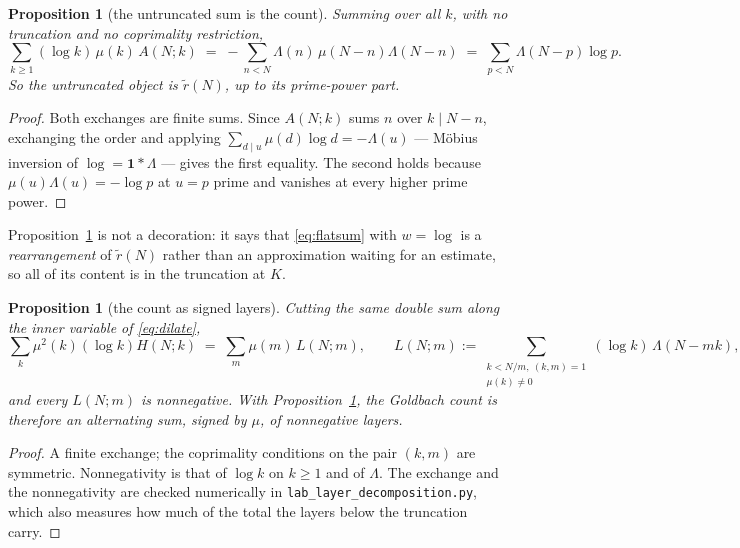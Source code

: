 \documentclass[11pt,a4paper]{article}
\theoremstyle{plain}
\newtheorem{proposition}[theorem]{Proposition}
\theoremstyle{definition}
\theoremstyle{remark}
\begin{document}
\begin{proposition}[the untruncated sum is the count]%
\label{prop:untrunc}
Summing over \emph{all} $k$, with no truncation and no coprimality
restriction,
\begin{equation}\label{eq:untrunc}
  \sum_{k\ge1}(\log k)\,\mu(k)\,A(N;k)
   \;=\;-\sum_{n<N}\Lambda(n)\,\mu(N-n)\Lambda(N-n)
   \;=\;\sum_{p<N}\Lambda(N-p)\log p .
\end{equation}
So the untruncated object \emph{is} $\tilde r(N)$, up to its
prime-power part.
\end{proposition}

\begin{proof}
Both exchanges are finite sums. Since $A(N;k)$ sums $n$ over
$k\mid N-n$, exchanging the order and applying
$\sum_{d\mid u}\mu(d)\log d=-\Lambda(u)$ --- M\"obius inversion of
$\log=\mathbf 1*\Lambda$ --- gives the first equality. The second
holds because $\mu(u)\Lambda(u)=-\log p$ at $u=p$ prime and vanishes
at every higher prime power.
\end{proof}

Proposition~\ref{prop:untrunc} is not a decoration: it says that
\eqref{eq:flatsum} with $w=\log$ is a \emph{rearrangement} of
$\tilde r(N)$ rather than an approximation waiting for an estimate,
so all of its content is in the truncation at $K$.

\begin{proposition}[the count as signed layers]\label{prop:layers}
Cutting the same double sum along the inner variable of
\eqref{eq:dilate},
\begin{equation}\label{eq:layers}
  \sum_{k}\mu^2(k)(\log k)H(N;k)\;=\;\sum_{m}\mu(m)\,L(N;m),
  \qquad
  L(N;m):=\!\!\sum_{\substack{k<N/m,\ (k,m)=1\\ \mu(k)\neq0}}\!\!
            (\log k)\,\Lambda(N-mk),
\end{equation}
and every $L(N;m)$ is nonnegative. With
Proposition~\ref{prop:untrunc}, the Goldbach count is therefore an
alternating sum, signed by $\mu$, of nonnegative layers.
\end{proposition}

\begin{proof}
A finite exchange; the coprimality conditions on the pair $(k,m)$ are
symmetric. Nonnegativity is that of $\log k$ on $k\ge1$ and of
$\Lambda$. The exchange and the nonnegativity are checked numerically
in \texttt{lab\_layer\_decomposition.py}, which also measures how much
of the total the layers below the truncation carry.
\end{proof}
\end{document}

